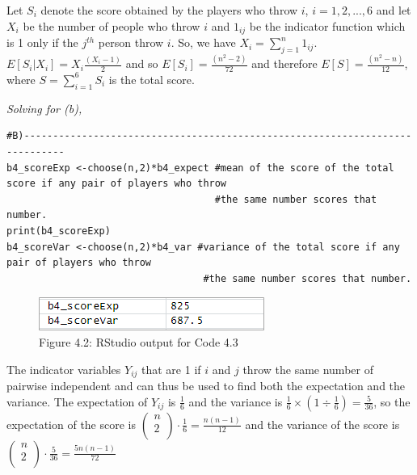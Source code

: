 \documentclass[12pt,letterpaper]{article}
\begin{document}
\begin{enumerate}[label=\Alph*]
    \noindent
    Let $S_i$ denote the score obtained by the players who throw $i$, $i=1,2,...,6$ and let $X_i$ be the number of people who throw $i$ and $1_{ij}$ be the indicator function which is 1 only if the $j^{th}$ person throw $i$. So, we have $X_i = \sum^{n}_{j=1}1_{ij}$. $E[S_i|X_i]=X_i\frac{(X_i-1)}{2}$ and so $E[S_i]=\frac{(n^2-2)}{72}$ and therefore $E[S]=\frac{(n^2-n)}{12}$, where $S=\sum^{6}_{i=1}S_i$ is the total score.

    \vspace*{1cm}
    \textit{Solving for (b),}
    \begin{lstlisting}[title=\footnotesize Code 4.3: Solving for (b)]
#B)-----------------------------------------------------------------------------
b4_scoreExp <-choose(n,2)*b4_expect #mean of the score of the total score if any pair of players who throw
                                    #the same number scores that number.
print(b4_scoreExp)
b4_scoreVar <-choose(n,2)*b4_var #variance of the total score if any pair of players who throw
                                  #the same number scores that number.
    \end{lstlisting}

    \begin{figure}[h]
      \centering
      \includegraphics{fig4.2.png}
      \caption*{\footnotesize Figure 4.2: RStudio output for Code 4.3}
    \end{figure}

    \noindent
    \normalsize
    The indicator variables $Y_{ij}$ that are 1 if $i$ and $j$ throw the same number of pairwise independent and can thus be used to find both the expectation and the variance. The expectation of $Y_{ij}$ is $\frac{1}{6}$ and the variance is $\frac{1}{6} \times (1 \div \frac{1}{6})=\frac{5}{36}$, so the expectation of the score is $\left( {\begin{array}{c}
      n  \\
      2  \\
   \end{array}} \right) \cdot \frac{1}{6}=\frac{n(n-1)}{12}$ and the variance of the score is $\left( {\begin{array}{c}
    n \\
    2  \\
 \end{array}} \right) \cdot \frac{5}{36} = \frac{5n(n-1)}{72}$

    \end{enumerate}
    \newpage
\end{document}
